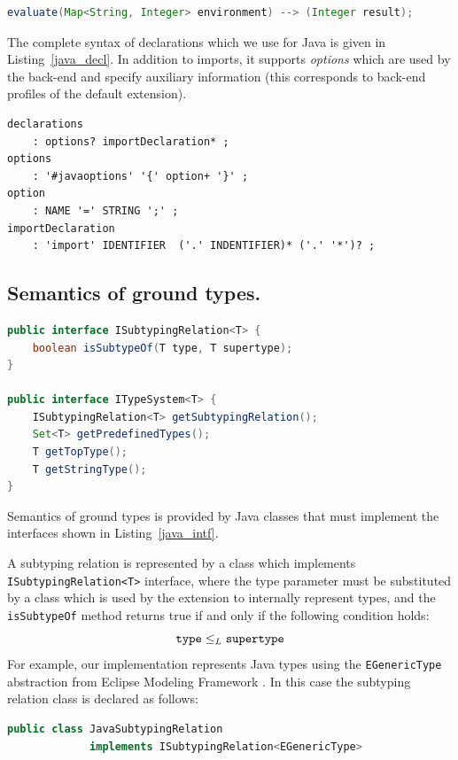 \documentclass{informat} %
\newcommand{\lstref}[1]{Listing~\ref{#1}}
\begin{document}
{\begin{lstlisting}[language=Java]
evaluate(Map<String, Integer> environment) --> (Integer result);
\end{lstlisting}
 
The complete syntax of declarations which we use for Java is given in \lstref{java_decl}. In addition to imports, it supports \emph{options} which are used by the back-end and specify auxiliary information (this corresponds to back-end profiles of the default extension).
\begin{lstlisting}[caption=Declaration syntax for Java 5,label=java_decl,float]
declarations
	: options? importDeclaration* ;
options
	: '#javaoptions' '{' option+ '}' ;
option
	: NAME '=' STRING ';' ;
importDeclaration
	: 'import' IDENTIFIER  ('.' INDENTIFIER)* ('.' '*')? ;
\end{lstlisting}

\subsection{Semantics of ground types.}

\begin{lstlisting}[language=Java,caption=Java interfaces describing semantics of ground types,label=java_intf,float]
public interface ISubtypingRelation<T> {
	boolean isSubtypeOf(T type, T supertype);
}

public interface ITypeSystem<T> {
	ISubtypingRelation<T> getSubtypingRelation();
	Set<T> getPredefinedTypes();
	T getTopType();
	T getStringType();
}
\end{lstlisting}

Semantics of ground types is provided by Java classes that must implement the interfaces shown in \lstref{java_intf}.

A subtyping relation is represented by a class which implements \texttt{ISubtypingRelation<T>} interface, where the type parameter must be substituted by a class which is used by the extension to internally represent types, and the \texttt{isSubtypeOf} method returns true if and only if the following condition holds:
$$\mathtt{type} \le_L \mathtt{supertype}$$
For example, our implementation represents Java types using the \texttt{EGenericType} abstraction from Eclipse Modeling Framework \cite{EMF}. In this case the subtyping relation class is declared as follows:
\begin{lstlisting}[language=Java]
public class JavaSubtypingRelation 
		 	 implements ISubtypingRelation<EGenericType>
\end{lstlisting}

}
\end{document}
